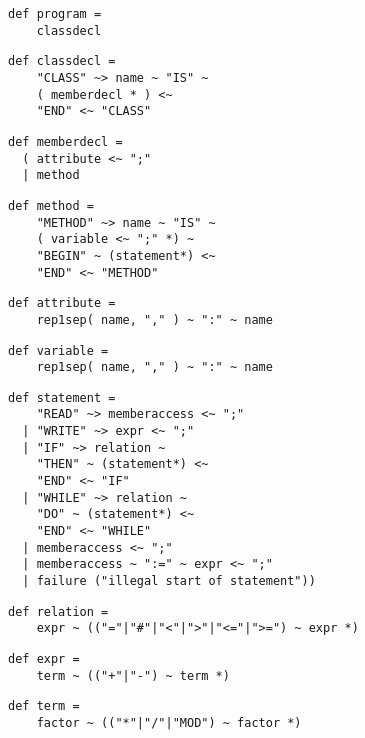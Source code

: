 \documentclass{style}
\begin{document}
\lstset{belowskip=5pt}
\begin{lstlisting}[name=parser]
def program = 
    classdecl                                           
\end{lstlisting}
\lstset{aboveskip=5pt}
\begin{lstlisting}[name=parser]
def classdecl =
    "CLASS" ~> name ~ "IS" ~
    ( memberdecl * ) <~
    "END" <~ "CLASS"     
\end{lstlisting}
\begin{lstlisting}[name=parser]
def memberdecl =
  ( attribute <~ ";"
  | method                                              
\end{lstlisting}
\begin{lstlisting}[name=parser]
def method =
    "METHOD" ~> name ~ "IS" ~
    ( variable <~ ";" *) ~
    "BEGIN" ~ (statement*) <~
    "END" <~ "METHOD"                                   
\end{lstlisting}
\begin{lstlisting}[name=parser]
def attribute =
    rep1sep( name, "," ) ~ ":" ~ name                   
\end{lstlisting}
\begin{lstlisting}[name=parser]
def variable =
    rep1sep( name, "," ) ~ ":" ~ name                   
\end{lstlisting}
\begin{lstlisting}[name=parser]
def statement =
    "READ" ~> memberaccess <~ ";"                       
  | "WRITE" ~> expr <~ ";"                              
  | "IF" ~> relation ~
    "THEN" ~ (statement*) <~
    "END" <~ "IF"                                       
  | "WHILE" ~> relation ~
    "DO" ~ (statement*) <~
    "END" <~ "WHILE"                                    
  | memberaccess <~ ";"                                 
  | memberaccess ~ ":=" ~ expr <~ ";"                   
  | failure ("illegal start of statement"))
\end{lstlisting}
\begin{lstlisting}[name=parser]
def relation =
    expr ~ (("="|"#"|"<"|">"|"<="|">=") ~ expr *)
\end{lstlisting}
\begin{lstlisting}[name=parser]
def expr =
    term ~ (("+"|"-") ~ term *)                         
\end{lstlisting}
\begin{lstlisting}[name=parser]
def term = 
    factor ~ (("*"|"/"|"MOD") ~ factor *)               
\end{lstlisting}
\end{document}
